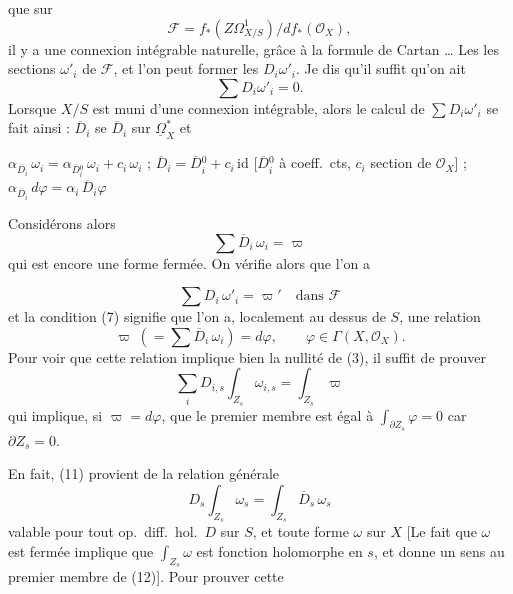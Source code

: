 \documentclass[11pt,a4paper]{article}
\begin{document}
que sur
\[
  \mathscr{F} = f_*(Z\Omega^1_{X/S}) / d f_*(\mathcal{O}_X) , \tag{6}
\]
il y a une connexion intégrable naturelle, grâce à la formule de Cartan …
Les   les sections $\omega'_i$ de
$\mathscr{F}$, et l'on peut former les $D_i \omega'_i$. Je dis qu'il suffit
qu'on ait
\[
  \sum D_i \omega'_i = 0 . \tag{7}
\]
Lorsque $X/S$ est muni d'une connexion intégrable, alors le calcul de
$\sum D_i \omega'_i$  se fait ainsi :  $\overline{D}_i$ se
  
$\overline{D}_i$ sur $\underline{\Omega}^*_X$  et \struck{\ill{}} \struck{qui à une forme fermée] \ill{} une forme}

\struck{(8)} $\alpha_{\overline{D}_i}\, \omega_i
= \alpha_{\overline{D}{}^0_i}\, \omega_i + c_i\, \omega_i$ ;
$\overline{D}_i = \overline{D}{}^0_i + c_i\, \mathrm{id}$
[$\overline{D}{}^0_i$ à coeff.\ cts, $c_i$ section de $\mathcal{O}_X$] ;
\struck{(9)} $\alpha_{\overline{D}_i}\, d\varphi
= \alpha_i\, \overline{D}_i \varphi$

Considérons alors
\[
  \sum \overline{D}_i\, \omega_i = \varpi \tag{8}
\]
qui est encore une forme fermée. On vérifie alors  que l'on a

\[
  \sum D_i\, \omega'_i = \varpi' \quad \text{dans } \mathscr{F} \tag{9}
\]
et la condition (7) signifie que l'on a, localement au dessus de $S$, une
relation
\[
  \varpi \;(= \textstyle\sum \overline{D}_i\, \omega_i) = d\varphi ,
  \qquad \varphi \in \Gamma(X, \mathcal{O}_X) . \tag{10}
\]
Pour voir que cette relation implique bien la nullité de (3), il suffit de
prouver
\[
  \sum_i D_{i,s} \int_{Z_s} \omega_{i,s} = \int_{Z_s} \varpi \tag{11}
\]
qui implique, si $\varpi = d\varphi$, que le premier membre est égal à
$\int_{\partial Z_s} \varphi = 0$ car $\partial Z_s = 0$.

En fait, (11) provient de la relation générale
\[
  D_s \int_{Z_s} \omega_s = \int_{Z_s} \overline{D}_s\, \omega_s \tag{12}
\]
valable pour tout op.\ diff.\ hol.\ $D$ sur $S$, et toute forme
 $\omega$ sur $X$ [Le fait que $\omega$ est fermée
implique que $\int_{Z_s} \omega$ est fonction holomorphe en $s$, et donne un
sens au premier membre de (12)]. Pour prouver cette
\end{document}
